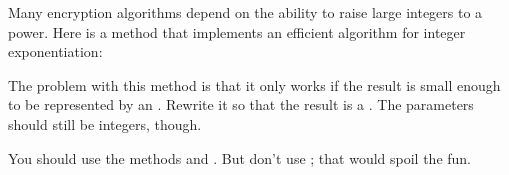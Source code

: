 \begin{exercise}  %

Many encryption algorithms depend on the ability to raise large integers to a power.
Here is a method that implements an efficient algorithm for integer exponentiation:


The problem with this method is that it only works if the result is small enough to be represented by an .
Rewrite it so that the result is a .
The parameters should still be integers, though.

You should use the  methods  and .
But don't use ; that would spoil the fun.

\end{exercise}


